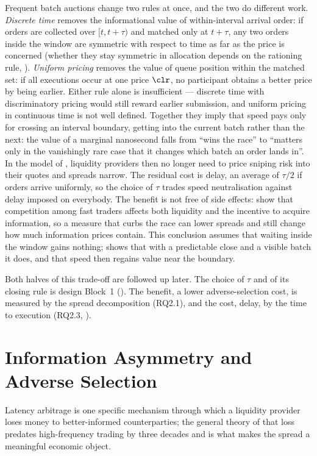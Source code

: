 Frequent batch auctions change two rules at once, and the two do
different work. \emph{Discrete time} removes the informational value of
within-interval arrival order: if orders are collected over $[t,
t+\tau)$ and matched only at $t+\tau$, any two orders inside the window
are symmetric with respect to time as far as the price is concerned
(whether they stay symmetric in allocation depends on the rationing rule,
). \emph{Uniform pricing} removes the
value of queue position within the matched set: if all executions occur
at one price $\clr$, no participant obtains a better price by being
earlier. Either rule alone is insufficient --- discrete time with
discriminatory pricing would still reward earlier submission, and uniform
pricing in continuous time is not well defined. Together they imply that
speed pays only for crossing an interval boundary, getting into the
current batch rather than the next: the value of a marginal nanosecond
falls from ``wins the race'' to ``matters only in the vanishingly rare
case that it changes which batch an order lands in''. In the model of
\citet{budish2015hft}, liquidity providers then no longer need to price
sniping risk into their quotes and spreads narrow. The residual cost is
delay, an average of $\tau/2$ if orders arrive uniformly, so the choice of
$\tau$ trades speed neutralisation against delay imposed on everybody.
The benefit is not free of side effects: \citet{baldauf2020hft} show that
competition among fast traders affects both liquidity and the incentive to
acquire information, so a measure that curbs the race can lower spreads
and still change how much information prices contain.
This conclusion assumes that waiting inside the window gains nothing;
 shows that with a predictable close and a
visible batch it does, and that speed then regains value near the
boundary.

Both halves of this trade-off are followed up later. The choice of $\tau$
and of its closing rule is design Block~1 (). The
benefit, a lower adverse-selection cost, is measured by the spread
decomposition (RQ2.1), and the cost, delay, by the time to execution
(RQ2.3, ).

\section{Information Asymmetry and Adverse Selection}
\label{sec:adverse}

Latency arbitrage is one specific mechanism through which a liquidity
provider loses money to better-informed counterparties; the general
theory of that loss predates high-frequency trading by three decades and
is what makes the spread a meaningful economic object.

